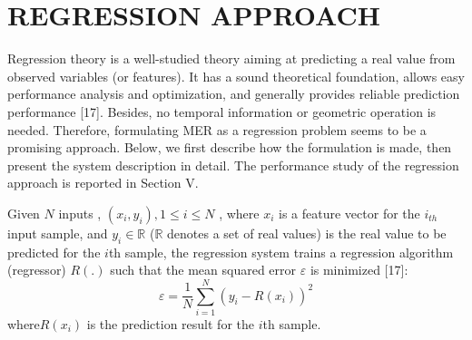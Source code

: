 \documentclass[journal, twoside]{IEEEtran}
\begin{document}
\section{REGRESSION APPROACH}
Regression theory is a well-studied theory aiming at predicting a real value from observed variables (or features). It
has a sound theoretical foundation, allows easy performance
analysis and optimization, and generally provides reliable
prediction performance [17]. Besides, no temporal information
or geometric operation is needed. Therefore, formulating MER
as a regression problem seems to be a promising approach.
Below, we first describe how the formulation is made, then
present the system description in detail. The performance study
of the regression approach is reported in Section V.

    Given \( N \) inputs , \((x_i,y_i), 1\leq i\leq N\) , where \(x_i\) is a feature
vector for the \(i_{th}\) input sample, and \(y_i \in \mathbb{R}\) (\(\mathbb{R}\) denotes a set of real values) is the real value to be predicted for the \(i\)th sample,
the regression system trains a regression algorithm (regressor) \(R(.)\) such that the mean squared error \(\varepsilon\) is minimized [17]:
\begin{equation}
\varepsilon = \frac{1}{N} \sum_{i=1}^{N} (y_i - R(x_i))^2
\end{equation}
where\(R(x_i)\) is the prediction result for the \(i\)th sample.
\end{document}
